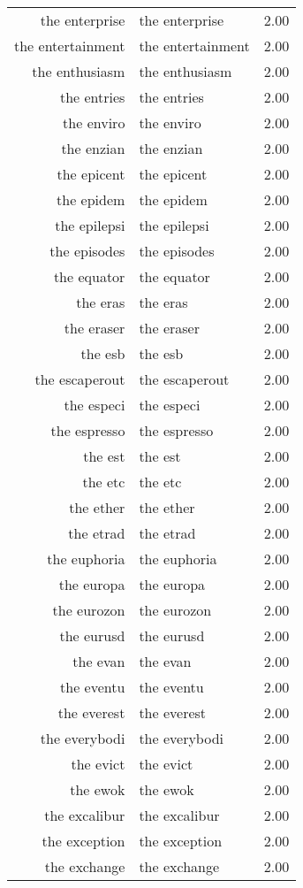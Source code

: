 \begin{table}[ht]
\begin{tabular}{rlr}
  the enterprise & the enterprise & 2.00 \\ 
  the entertainment & the entertainment & 2.00 \\ 
  the enthusiasm & the enthusiasm & 2.00 \\ 
  the entries & the entries & 2.00 \\ 
  the enviro & the enviro & 2.00 \\ 
  the enzian & the enzian & 2.00 \\ 
  the epicent & the epicent & 2.00 \\ 
  the epidem & the epidem & 2.00 \\ 
  the epilepsi & the epilepsi & 2.00 \\ 
  the episodes & the episodes & 2.00 \\ 
  the equator & the equator & 2.00 \\ 
  the eras & the eras & 2.00 \\ 
  the eraser & the eraser & 2.00 \\ 
  the esb & the esb & 2.00 \\ 
  the escaperout & the escaperout & 2.00 \\ 
  the especi & the especi & 2.00 \\ 
  the espresso & the espresso & 2.00 \\ 
  the est & the est & 2.00 \\ 
  the etc & the etc & 2.00 \\ 
  the ether & the ether & 2.00 \\ 
  the etrad & the etrad & 2.00 \\ 
  the euphoria & the euphoria & 2.00 \\ 
  the europa & the europa & 2.00 \\ 
  the eurozon & the eurozon & 2.00 \\ 
  the eurusd & the eurusd & 2.00 \\ 
  the evan & the evan & 2.00 \\ 
  the eventu & the eventu & 2.00 \\ 
  the everest & the everest & 2.00 \\ 
  the everybodi & the everybodi & 2.00 \\ 
  the evict & the evict & 2.00 \\ 
  the ewok & the ewok & 2.00 \\ 
  the excalibur & the excalibur & 2.00 \\ 
  the exception & the exception & 2.00 \\ 
  the exchange & the exchange & 2.00 \\ 

\end{tabular}
\end{table}
